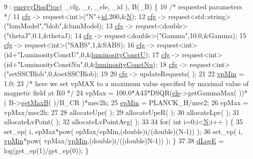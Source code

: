 \begin{DoxyCode}
9                                                                                                           :
       \hyperlink{classenergyDissProc_a0cf0b423089016fbe8a697378c519590}{energyDissProc}( \_cfg, \_r, \_ele, \_id ), B(\_B) \{
10   \textcolor{comment}{/* requested parameters */}
11   \hyperlink{classbaseClass_a744f87a6ebe63da08256c022d42a4ca7}{cfg} -> request<int>(\textcolor{stringliteral}{"N"}+\hyperlink{classbaseClass_a4d5ff386a69bcbe21b5976f55b624df6}{id},200,&\hyperlink{classbaseClass_a2b4d07d2b46197d495de0477f4bb22f8}{N});
12   \hyperlink{classbaseClass_a744f87a6ebe63da08256c022d42a4ca7}{cfg} -> request<std::string>(\textcolor{stringliteral}{"lumModel"},\textcolor{stringliteral}{"blob"},&lumModel);
13   \hyperlink{classbaseClass_a744f87a6ebe63da08256c022d42a4ca7}{cfg} -> request<double>(\textcolor{stringliteral}{"thetaJ"},0.1,&thetaJ);
14   \hyperlink{classbaseClass_a744f87a6ebe63da08256c022d42a4ca7}{cfg} -> request<double>(\textcolor{stringliteral}{"Gamma"},10.0,&Gamma);
15   \hyperlink{classbaseClass_a744f87a6ebe63da08256c022d42a4ca7}{cfg} -> request<int>(\textcolor{stringliteral}{"SABS"},1,&SABS);
16   \hyperlink{classbaseClass_a744f87a6ebe63da08256c022d42a4ca7}{cfg} -> request<int>(\textcolor{keywordtype}{id}+\textcolor{stringliteral}{"LuminosityConstU"},0,&\hyperlink{classenergyDissProc_a2cc4e4eae15982f977a0dfa5458d80f4}{luminosityConstU});  
17   \hyperlink{classbaseClass_a744f87a6ebe63da08256c022d42a4ca7}{cfg} -> request<int>(\textcolor{keywordtype}{id}+\textcolor{stringliteral}{"LuminosityConstNu"},0,&\hyperlink{classenergyDissProc_a0a23854c1c830dfb9ac33d116fce5b7d}{luminosityConstNu});  
18   \hyperlink{classbaseClass_a744f87a6ebe63da08256c022d42a4ca7}{cfg} -> request<int>(\textcolor{stringliteral}{"setSSCBlob"},0,&setSSCBlob);  
19 
20   \hyperlink{classbaseClass_a744f87a6ebe63da08256c022d42a4ca7}{cfg} -> updateRequests( );
21 
22   \hyperlink{classenergyDissProc_aafedd3c012010a8e8aa34247660fea3b}{vpMin} = 1.0;
23   \textcolor{comment}{/* here we set vpMAX to a maximum value specified by maximal value of magnetic field at R0 */}
24   vpMax = 100.0*A43*DSQR(\hyperlink{classenergyDissProc_a0dbf0777938131e938c1fdad5df38a7f}{ele}->getGammaMax( ))*( B->\hyperlink{classmagneticField_a3b573d12649137290d521539b903da8d}{getMaxB}( )/B\_CR )*mec2h;
25   \hyperlink{classenergyDissProc_a57aee74ef8fc4cb9220127a9c345174a}{epMin} = PLANCK\_H/mec2;
26   epMax = vpMax/mec2h;
27   
28   allocateUpe( );
29   allocateUpeR( );
30   allocateLpv( );
31   allocateLvPoint( );
32   allocateLvPointAvg( );
33 
34   \textcolor{keywordflow}{for}( \textcolor{keywordtype}{int} i=0;i<\hyperlink{classbaseClass_a2b4d07d2b46197d495de0477f4bb22f8}{N};i++ ) \{
35     set\_ep( i, epMax*pow( epMax/epMin,(\textcolor{keywordtype}{double})i/(\textcolor{keywordtype}{double})(N-1)) );
36     set\_vp( i, \hyperlink{classenergyDissProc_aafedd3c012010a8e8aa34247660fea3b}{vpMin}*pow( vpMax/\hyperlink{classenergyDissProc_aafedd3c012010a8e8aa34247660fea3b}{vpMin},(\textcolor{keywordtype}{double})i/((\textcolor{keywordtype}{double})N-1)) ); \}
37 
38   \hyperlink{classenergyDissProc_a270fdc20de5c26f9cc499f28dd32fb7b}{dLogE} = log(get\_ep(1)/get\_ep(0)); \}
\end{DoxyCode}
